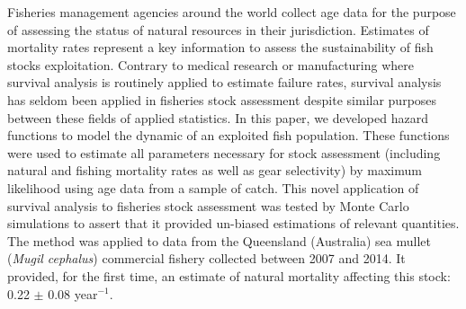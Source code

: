 Fisheries management agencies around the world collect age data for the purpose of assessing the status of natural resources in their jurisdiction. Estimates of mortality rates represent a key information to assess the sustainability of fish stocks exploitation. Contrary to medical research or manufacturing where survival analysis is routinely applied to estimate failure rates, survival analysis has seldom been applied in fisheries stock assessment despite similar purposes between these fields of applied statistics. In this paper, we developed hazard functions to model the dynamic of an exploited fish population. These functions were used to estimate all parameters necessary for stock assessment (including natural and fishing mortality rates as well as gear selectivity) by maximum likelihood using age data from a sample of catch. This novel application of survival analysis to fisheries stock assessment was tested by Monte Carlo simulations to assert that it provided un-biased estimations of relevant quantities. The method was applied to data from the Queensland (Australia) sea mullet ({\it Mugil cephalus}) commercial fishery collected between 2007 and 2014. It provided, for the first time, an estimate of natural mortality affecting this stock: 0.22 $\pm$ 0.08 year$^{-1}$.


